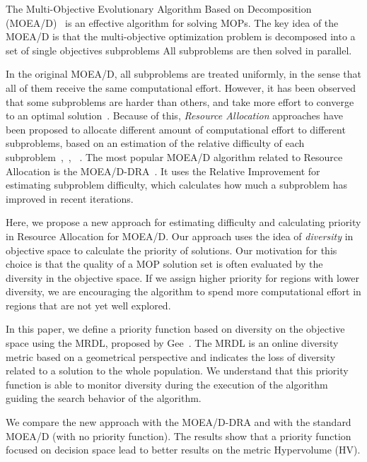 The Multi-Objective Evolutionary Algorithm Based on Decomposition
(MOEA/D)~\cite{zhang2007moea} is an effective algorithm for solving MOPs. The
key idea of the MOEA/D is that the multi-objective optimization problem is
decomposed into a set of single objectives subproblems All subproblems
are then solved in parallel.

In the original MOEA/D, all subproblems are treated uniformly, in the sense that
all of them receive the same computational effort. However, it has been observed
that some subproblems are harder than others, and take more effort to converge
to an optimal solution~\cite{zhou2016all}. Because of this, \emph{Resource
	Allocation} approaches have been proposed to allocate different amount of
computational effort to different subproblems, based on an estimation of the
relative difficulty of each subproblem~\cite{zhou2016all},~\cite{zhang2009performance},	~\cite{kang2018collaborative}. The most popular MOEA/D algorithm related to Resource Allocation is the MOEA/D-DRA~\cite{zhang2009performance}. It uses the Relative Improvement for estimating subproblem
difficulty, which calculates how much a subproblem
has improved in recent iterations.


Here, we propose a new approach for estimating difficulty and
calculating priority in Resource Allocation for MOEA/D. Our approach uses the
idea of \emph{diversity} in objective space to calculate
the priority of solutions. Our motivation for this choice is that the quality of
a MOP solution set is often evaluated by the diversity in the objective space.
If we assign higher priority for regions with lower diversity, we are
encouraging the algorithm to spend more computational effort in regions that are
not yet well explored.

In this paper, we define a priority function based on diversity on the objective space using the MRDL, proposed by Gee~\cite{gee2015online}. The MRDL is an online diversity metric based on a geometrical perspective and indicates the loss of diversity related to a solution to the whole population. We understand that this priority function is able to monitor diversity during the execution of the algorithm guiding the search behavior of the algorithm.


We compare the new approach with the MOEA/D-DRA and with the standard MOEA/D (with no priority function). The results show that a priority function focused on decision space lead to better results on the metric Hypervolume (HV).


